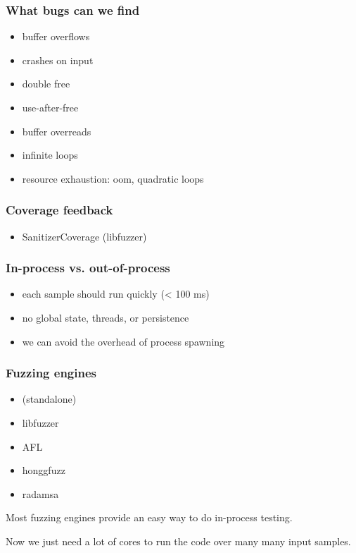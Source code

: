\documentclass[serif]{beamer}
\begin{document}
\begin{frame}
  \frametitle{What bugs can we find}

  \begin{itemize}
  \item buffer overflows
  \item crashes on input
  \item double free\\[1 em]

  \item use-after-free
  \item buffer overreads\\[1 em]

  \item infinite loops
  \item resource exhaustion: oom, quadratic loops
  \end{itemize}
\end{frame}

\begin{frame}
  \frametitle{Coverage feedback}

  \begin{itemize}
  \item SanitizerCoverage (libfuzzer)
  \end{itemize}
\end{frame}

\begin{frame}
  \frametitle{In-process vs. out-of-process}

  \begin{itemize}
  \item each sample should run quickly (< 100 ms)
  \item no global state, threads, or persistence
  \item we can avoid the overhead of process spawning
  \end{itemize}
\end{frame}

\begin{frame}
  \frametitle{Fuzzing engines}
  \begin{itemize}
  \item (standalone)
  \item libfuzzer
  \item AFL
  \item honggfuzz
  \item radamsa
  \end{itemize}

  Most fuzzing engines provide an easy way to do in-process testing.

  \pause
  Now we just need a lot of cores to run the code over many many input samples.
\end{frame}
\end{document}
